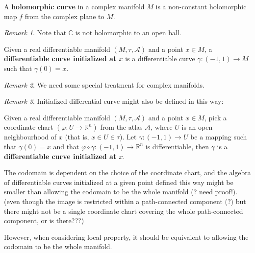 \documentclass[12pt, letterpaper]{article}
\newcommand{\re}{\mathbb{R}}
\newcommand{\co}{\mathbb{C}}
\theoremstyle{definition}
\theoremstyle{remark}
\newtheorem*{rem*}{Remark}
\theoremstyle{definition}
\theoremstyle{plain}
\numberwithin{equation}{section}
\begin{document}
	\begin{def*}
		A \textbf{holomorphic curve} in a complex manifold $M$
		is a non-constant holomorphic map $f$ from the complex plane to $M$.
	\end{def*}
	\begin{rem*}
		Note that $\co$ is not holomorphic to an open ball.
	\end{rem*}
	
	\begin{def*}
		Given a real differentiable manifold $(M,\tau,\mathcal{A})$ and a point $x\in M$,
		a \textbf{differentiable curve initialized at $x$}
		is a differentiable curve $\gamma\colon(-1,1)\to M$ such that $\gamma(0)=x$.
	\end{def*}
	\begin{rem*}		
		We need some special treatment for complex manifolds.
	\end{rem*}

	\begin{rem*}
		Initialized differential curve might also be defined in this way:
		
		Given a real differentiable manifold $(M,\tau,\mathcal{A})$ and a point $x\in M$,
		pick a coordinate chart $(\varphi \colon U \to \re^{n})$ from the atlas $\mathcal{A}$, where $U$ is an open neighbourhood
		of $x$ (that is, $x\in U\in\tau$). Let $\gamma\colon (-1,1)\to U$ be a mapping such that $\gamma(0)=x$ and that
		$\varphi\circ\gamma\colon(-1,1)\to \re^{n}$ is differentiable,
		then $\gamma$ is a \textbf{differentiable curve initialized at $x$}.
		
		
		
		The codomain is dependent on the choice of the coordinate chart,
		and the algebra of differentiable curves initialized at a given point defined this way
		might be smaller than allowing the codomain to be the whole manifold (? need proof!).
		(even though the image is restricted within a path-connected component (?)
		but there might not be a single coordinate chart covering the whole
		path-connected component, or is there???)
		
		
		However, when considering local property,
		it should be equivalent to allowing the codomain to be the whole manifold.
	\end{rem*}
\end{document}
